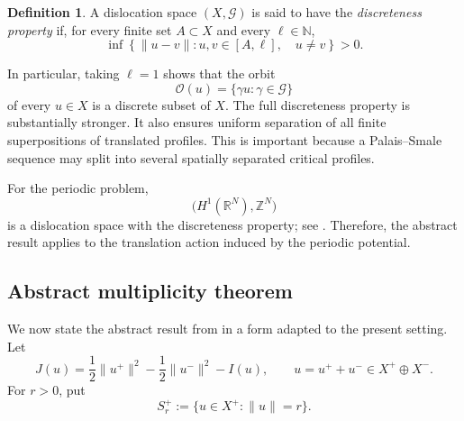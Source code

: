 \documentclass[11pt]{amsart}
\numberwithin{equation}{section}
\theoremstyle{definition}
\newtheorem{definition}[theorem]{Definition}
\newcommand{\R}{\mathbb{R}}
\newcommand{\Z}{\mathbb{Z}}
\newcommand{\N}{\mathbb{N}}
\newcommand{\cG}{\mathcal{G}}
\begin{document}
\begin{definition}
A dislocation space $(X,\cG)$ is said to have the \emph{discreteness
property} if, for every finite set $A\subset X$ and every $\ell\in\N$,
\[
\inf
\left\{
\|u-v\|:
u,v\in[A,\ell],\quad u\neq v
\right\}
>0.
\]
\end{definition}

In particular, taking $\ell=1$ shows that the orbit
\[
\mathcal{O}(u)=\{\gamma u:\gamma\in\cG\}
\]
of every $u\in X$ is a discrete subset of $X$. The full discreteness
property is substantially stronger. It also ensures uniform separation of
all finite superpositions of translated profiles. This is important because
a Palais--Smale sequence may split into several spatially separated
critical profiles.

For the periodic problem,
\[
\bigl(H^1(\R^N),\Z^N\bigr)
\]
is a dislocation space with the discreteness property; see
\cite[Example~2.13]{BBS2025}. Therefore, the
abstract result applies to the translation action induced by the periodic
potential.

\subsection{Abstract multiplicity theorem}

We now state the abstract result from \cite{BBS2025} in a form adapted to
the present setting. Let
\[
J(u)
=
\frac12\|u^+\|^2
-
\frac12\|u^-\|^2
-
I(u),
\qquad
u=u^++u^-\in X^+\oplus X^-.
\]
For $r>0$, put
\[
S_r^+
:=
\{u\in X^+:\|u\|=r\}.
\]
\end{document}
